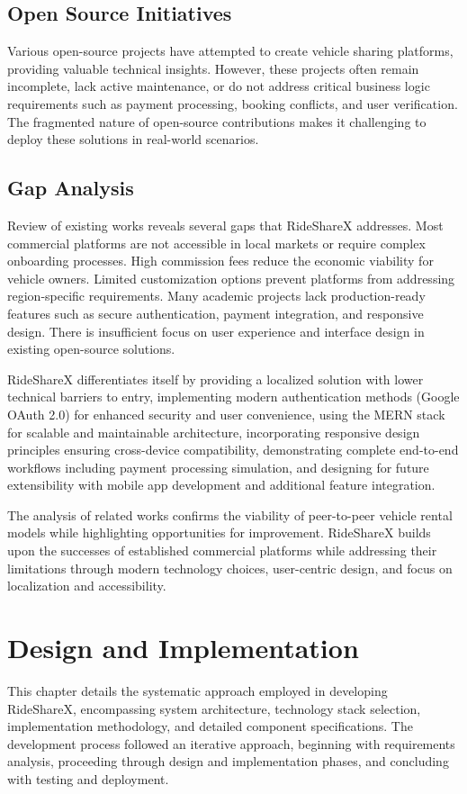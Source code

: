 \documentclass[12pt,a4paper]{report}
\begin{document}
	\section{Open Source Initiatives}
	
	Various open-source projects have attempted to create vehicle sharing platforms, providing valuable technical insights. However, these projects often remain incomplete, lack active maintenance, or do not address critical business logic requirements such as payment processing, booking conflicts, and user verification. The fragmented nature of open-source contributions makes it challenging to deploy these solutions in real-world scenarios.
	
	\section{Gap Analysis}
	
	Review of existing works reveals several gaps that RideShareX addresses. Most commercial platforms are not accessible in local markets or require complex onboarding processes. High commission fees reduce the economic viability for vehicle owners. Limited customization options prevent platforms from addressing region-specific requirements. Many academic projects lack production-ready features such as secure authentication, payment integration, and responsive design. There is insufficient focus on user experience and interface design in existing open-source solutions.
	
	RideShareX differentiates itself by providing a localized solution with lower technical barriers to entry, implementing modern authentication methods (Google OAuth 2.0) for enhanced security and user convenience, using the MERN stack for scalable and maintainable architecture, incorporating responsive design principles ensuring cross-device compatibility, demonstrating complete end-to-end workflows including payment processing simulation, and designing for future extensibility with mobile app development and additional feature integration.
	
	The analysis of related works confirms the viability of peer-to-peer vehicle rental models while highlighting opportunities for improvement. RideShareX builds upon the successes of established commercial platforms while addressing their limitations through modern technology choices, user-centric design, and focus on localization and accessibility.
	
	
	\chapter{Design and Implementation}
	This chapter details the systematic approach employed in developing RideShareX, encompassing system architecture, technology stack selection, implementation methodology, and detailed component specifications. The development process followed an iterative approach, beginning with requirements analysis, proceeding through design and implementation phases, and concluding with testing and deployment.
	
\end{document}
